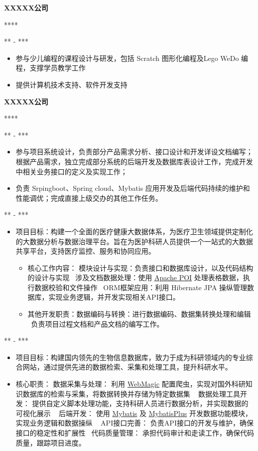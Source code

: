 \documentclass[11pt,a4paper]{article}
\newcommand{\company}[1]{%
    {\vspace{0.2em}\sffamily\textbf{\large#1}}%
}
\newcommand{\position}[2]{%
    \vspace{0.1em}  %
    \role{#1}\hfill\role{#2}%
    \vspace{0.2em}  %
}
\newcommand{\role}[1]{{\sffamily\color{graytext}\small#1}}
\newcommand{\daterange}[1]{\hfill{\sffamily\color{graytext}\small#1}}
\newcommand{\project}[1]{{\sffamily\textbf{\cjkit { \textit {\itshape#1}}}}}
\newcommand{\separator}{\textbullet~}  %
\begin{document}
\company{XXXXX公司} 
\position{***}{***}
\daterange{*** - ***}
\begin{itemize}
    \item 参与少儿编程的课程设计与研发，包括 Scratch 图形化编程及Lego WeDo 编程，支撑学员教学工作
    \item 提供计算机技术支持、软件开发支持
\end{itemize}

\company{XXXXX公司} 
\position{***}{***}
\daterange{*** - ***}
\begin{itemize}
    \item 参与项目系统设计，负责部分产品需求分析、接口设计和开发详设文档编写；根据产品需求，独立完成部分系统的后端开发及数据库表设计工作，完成开发中相关业务接口的定义及实现工作；
    \item 负责 Srpingboot、Spring cloud、Mybatis 应用开发及后端代码持续的维护和性能调优；完成直接上级交办的其他工作任务。
\end{itemize}

\project{XXX系统}
\daterange{*** - ***}
\begin{itemize}
    \item 项目目标：构建一个全面的医疗健康大数据体系，为医疗卫生领域提供定制化的大数据分析与数据治理平台。旨在为医护科研人员提供一个一站式的大数据共享平台，支持医疗监控、服务和协同应用。
        \begin{itemize}
            \item 核心工作内容： 模块设计与实现：负责接口和数据库设计，以及代码结构的设计与实现 \separator 涉及文档数据处理：使用 \href{https://poi.apache.org/}{Apache POI} 处理表格数据，执行数据校验和文件操作 \separator ORM框架应用：利用 Hibernate JPA 操纵管理数据库，实现业务逻辑，并开发实现相关API接口。
            \item 其他开发职责：数据编码与转换：进行数据编码、数据集转换处理和编辑 \separator 负责项目过程文档和产品文档的编写工作。
        \end{itemize}
\end{itemize}

\project{XXX系统}
\daterange{*** - ***}
\begin{itemize}
    \item 项目目标：构建国内领先的生物信息数据库，致力于成为科研领域内的专业综合网站，通过提供先进的数据检索、采集和处理工具，提升科研水平。
    \item 核心职责： 数据采集与处理： 利用 \href{https://webmagic.io/}{WebMagic} 配置爬虫，实现对国外科研知识数据库的检索与采集，将数据转换并存储为特定数据集 \separator 
            数据处理工具开发： 提供自定义脚本处理功能，支持科研人员进行数据分析，并实现数据的可视化展示 \separator 
            后端开发： 使用 \href{https://mybatis.org/mybatis-3/zh/index.html}{Mybatis} 及 \href{https://mybatis.plus/}{MybatisPlus} 开发数据功能模块，实现业务逻辑和数据操纵 \separator 
            API接口完善： 负责API接口的开发与维护，确保接口的稳定性和扩展性 \separator 代码质量管理： 承担代码审计和走读工作，确保代码质量，跟踪项目进度。
\end{itemize}
\end{document}
